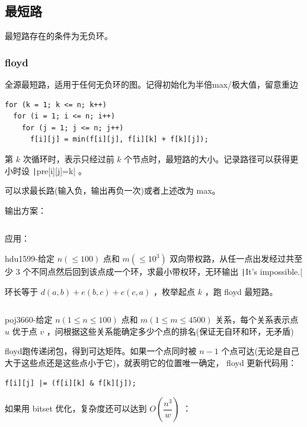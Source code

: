 \documentclass[twocolumn,10pt]{ctexart}
\begin{document}
\subsection{最短路}

最短路存在的条件为无负环。

\subsubsection{floyd}

全源最短路，适用于任何无负环的图。记得初始化为半倍max/极大值，留意重边

\begin{verbatim}
for (k = 1; k <= n; k++) 
  for (i = 1; i <= n; i++)
    for (j = 1; j <= n; j++) 
      f[i][j] = min(f[i][j], f[i][k] + f[k][j]);
\end{verbatim}

第 $k$ 次循环时，表示只经过前 $k$ 个节点时，最短路的大小。记录路径可以获得更小时设 \texttt|pre[i][j]=k| 。

可以求最长路(输入负，输出再负一次)或者上述改为 max。

输出方案：

\inputminted{cpp}{code/ext_034.cpp}

应用：

\begin{notebox}
hdu1599-给定 $n(\le100)$ 点和 $m(\le10^3)$ 双向带权路，从任一点出发经过共至少 $3$ 个不同点然后回到该点成一个环，求最小带权环，无环输出 \texttt|It's impossible.|
\end{notebox}

环长等于 $d(a,b)+e(b,c)+e(c,a)$ ，枚举起点 $k$ ，跑 floyd 最短路。

\inputminted{cpp}{code/hdu1599_floyd.cpp}

\begin{notebox}
poj3660-给定 $n(1\le n\le100)$ 点和 $m(1\le m\le4500)$ 关系，每个关系表示点 $u$ 优于点 $v$ ，问根据这些关系能确定多少个点的排名(保证无自环和环，无矛盾)
\end{notebox}

floyd跑传递闭包，得到可达矩阵。如果一个点同时被 $n-1$ 个点可达(无论是自己大于这些点还是这些点小于它)，就表明它的位置唯一确定， floyd 更新代码用：

\begin{verbatim}
f[i][j] |= (f[i][k] & f[k][j]);
\end{verbatim}

如果用 bitset 优化，复杂度还可以达到 $O(\dfrac{n^3}w)$ ：
\end{document}
